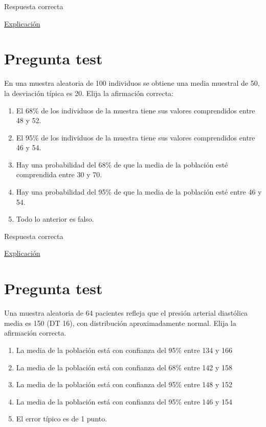 \documentclass[
]{book}
\providecommand{\tightlist}{%
  \setlength{\itemsep}{0pt}\setlength{\parskip}{0pt}}
\begin{document}
Respuesta correcta

\href{https://homepage.divms.uiowa.edu/~mbognar/}{Explicación}

\hypertarget{pregunta-test-99}{%
\section{Pregunta test}\label{pregunta-test-99}}

En una muestra aleatoria de 100 individuos se obtiene una media muestral de 50, la desviación típica es 20. Elija la afirmación correcta:

\begin{enumerate}
\def\labelenumi{\alph{enumi})}
\tightlist
\item
  El 68\% de los individuos de la muestra tiene sus valores comprendidos entre 48 y 52.
\item
  El 95\% de los individuos de la muestra tiene sus valores comprendidos entre 46 y 54.
\item
  Hay una probabilidad del 68\% de que la media de la población esté comprendida entre 30 y 70.
\item
  Hay una probabilidad del 95\% de que la media de la población esté entre 46 y 54.
\item
  Todo lo anterior es falso.
\end{enumerate}

Respuesta correcta

\href{https://homepage.divms.uiowa.edu/~mbognar/}{Explicación}

\hypertarget{pregunta-test-100}{%
\section{Pregunta test}\label{pregunta-test-100}}

Una muestra aleatoria de 64 pacientes refleja que el presión arterial diastólica media es 150 (DT 16), con distribución aproximadamente normal. Elija la afirmación correcta.

\begin{enumerate}
\def\labelenumi{\alph{enumi})}
\tightlist
\item
  La media de la población está con confianza del 95\% entre 134 y 166
\item
  La media de la población está con confianza del 68\% entre 142 y 158
\item
  La media de la población está con confianza del 95\% entre 148 y 152
\item
  La media de la población está con confianza del 95\% entre 146 y 154
\item
  El error típico es de 1 punto.
\end{enumerate}
\end{document}
